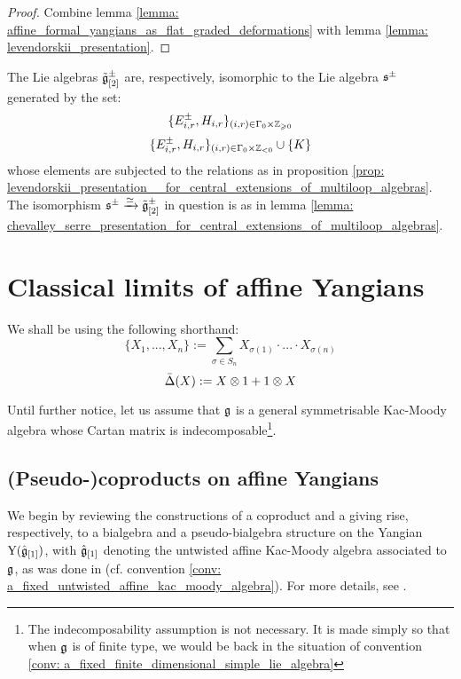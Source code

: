             \begin{proof}
                Combine lemma \ref{lemma: affine_formal_yangians_as_flat_graded_deformations} with lemma \ref{lemma: levendorskii_presentation}. 
            \end{proof}
        \begin{corollary} \label{coro: levendorskii_presentation__for_central_extensions_of_multiloop_algebras}
            The Lie algebras $\tilde{\mathfrak{g}}_{[2]}^{\pm}$ are, respectively, isomorphic to the Lie algebra $\mathfrak{s}^{\pm}$ generated by the set:
                $$\{ E_{i, r}^{\pm}, H_{i, r} \}_{(i, r) \in \Gamma_0 \x \Z_{\geq 0}}$$
                $$\{ E_{i, r}^{\pm}, H_{i, r} \}_{(i, r) \in \Gamma_0 \x \Z_{< 0}} \cup \{K\}$$
            whose elements are subjected to the relations as in proposition \ref{prop: levendorskii_presentation__for_central_extensions_of_multiloop_algebras}. The isomorphism $\mathfrak{s}^{\pm} \xrightarrow[]{\simeq} \tilde{\mathfrak{g}}_{[2]}^{\pm}$ in question is as in lemma \ref{lemma: chevalley_serre_presentation_for_central_extensions_of_multiloop_algebras}.
        \end{corollary}

    \section{Classical limits of affine Yangians}
        \begin{convention}
            We shall be using the following shorthand:
                $$\{ X_1, ..., X_n \} := \sum_{\sigma \in S_n} X_{\sigma(1)} \cdot ... \cdot X_{\sigma(n)}$$
                $$\bar{\Delta}(X) := X \tensor 1 + 1 \tensor X$$
        \end{convention}

        \begin{convention} \label{conv: general_symmetrisable_kac_moody_algebra}
            Until further notice, let us assume that $\mathfrak{g}$ is a general symmetrisable Kac-Moody algebra whose Cartan matrix is indecomposable\footnote{The indecomposability assumption is not necessary. It is made simply so that when $\mathfrak{g}$ is of finite type, we would be back in the situation of convention \ref{conv: a_fixed_finite_dimensional_simple_lie_algebra}}.
        \end{convention}

        \subsection{(Pseudo-)coproducts on affine Yangians}
            We begin by reviewing the constructions of a coproduct and a  giving rise, respectively, to a bialgebra and a pseudo-bialgebra structure on the Yangian $\mathrm{Y}(\hat{\mathfrak{g}}_{[1]})$, with $\hat{\mathfrak{g}}_{[1]}$ denoting the untwisted affine Kac-Moody algebra associated to $\mathfrak{g}$, as was done in \cite[Chapter 7]{kac_infinite_dimensional_lie_algebras} (cf. convention \ref{conv: a_fixed_untwisted_affine_kac_moody_algebra}). For more details, see \cite[Sections 4, 5, and 6]{guay_nakajima_wendlandt_affine_yangian_coproduct}.

